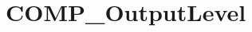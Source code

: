 \hypertarget{group___c_o_m_p___output_level}{\section{C\-O\-M\-P\-\_\-\-Output\-Level}
\label{group___c_o_m_p___output_level}
}
